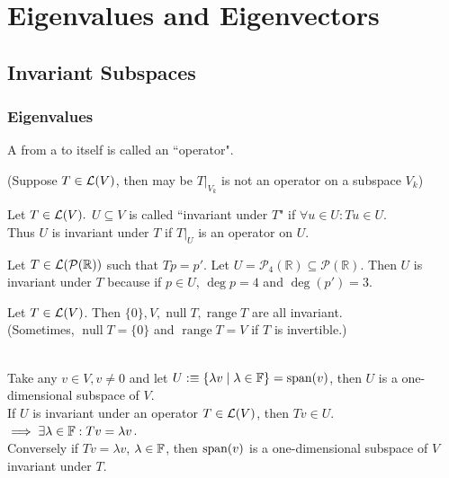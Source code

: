\chapter{Eigenvalues and Eigenvectors}
\section{Invariant Subspaces}
\subsection{Eigenvalues}

\begin{mydef}
    A \lm from a \vs to itself is called an ``operator".
\end{mydef}

(Suppose $T\in \mathcal{L}(V)$, then may be $\left.T\right|_{V_{k}}$ is not an operator on a subspace $V_k$)

\begin{mydef}
    Let $T\in \mathcal{L}(V).$ $U \subseteq V$ is called ``invariant under $T$" if $\forall u \in U: Tu \in U.$ \\
    Thus $U$ is invariant under $T$ if $\left.T\right|_{U}$ is an operator on $U.$
\end{mydef}

\begin{example}
    Let $T\in \mathcal{L}(\mathcal{P}(\mathbb{R}))$ such that $Tp=p'.$ Let $U=\mathcal{P}_4(\mathbb{R}) \subseteq \mathcal{P}(\mathbb{R}).$ Then $U$ is invariant under $T$
    because if $p \in U$, $\deg p = 4$ and $\deg (p')=3$.
\end{example}

\begin{example}
    Let $T\in \mathcal{L}(V)$. Then $\{0\}, V, \operatorname{null} T, \operatorname{range} T$ are all invariant. \\
    (Sometimes, $\operatorname{null} T = \{0\}$ and $\operatorname{range} T=V$ if $T$ is invertible.)
\end{example}

 \\
Take any $v\in V, v\neq 0$ and let $U :\equiv \{  \lambda v \mid \lambda \in \mathbb{F} \} = \operatorname{span} (v)$, then $U$ is a one-dimensional subspace of $V$. \\
If $U$ is invariant under an operator $T \in \mathcal{L} (V)$, then $Tv  \in U$. $\implies \exists \lambda \in \mathbb{F}: Tv = \lambda v$. \\
Conversely if $Tv = \lambda v$, $\lambda \in \mathbb{F}$, then $\operatorname{span} (v)$ is a one-dimensional subspace of $V$ invariant under $T$.

